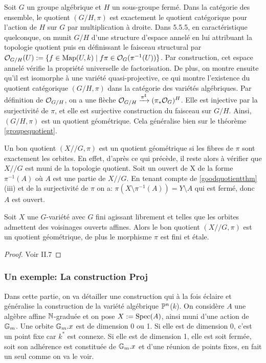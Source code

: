 \begin{ex}\label{groupQuotientGeometrique}
Soit $G$ un groupe algébrique et $H$ un sous-groupe fermé. Dans la catégorie des ensemble, le quotient $(G/H,\pi)$ est exactement le quotient catégorique pour l'action de $H$ sur $G$ par multiplication à droite. Dans \cite{LAGSpringer} 5.5.5, en caractéristique quelconque, on munit $G/H$ d'une structure d'espace annelé en lui attribuant la topologie quotient puis en définissant le faisceau structural par $\mathcal{O}_{G/H}(U):=\lbrace f\in\textrm{Map}(U,k)\mid f\pi \in \mathcal{O}_G(\pi^{-1}(U))\rbrace$. Par construction, cet espace annelé vérifie la propriété universelle de factorisation. De plus, on montre ensuite qu'il est isomorphe à une variété quasi-projective, ce qui montre l'existence du quotient catégorique $(G/H,\pi)$ dans la catégorie des variétés algébriques. Par définition de $\mathcal{O}_{G/H}$, on a une flèche $\mathcal{O}_{G/H} \xrightarrow{\pi^\sharp} (\pi_*\mathcal{O}_G)^H$. Elle est injective par la surjectivité de $\pi$, et elle est surjective construction du faisceau sur $G/H$. Ainsi, $(G/H,\pi)$ est un quotient géométrique. Cela généralise bien sur le théorème \ref{groupequotient}.
\end{ex}

\begin{ex}
Un bon quotient $(X//G, \pi)$ est un quotient géométrique si les fibres de $\pi$ sont exactement les orbites. En effet, d'après ce qui précède, il reste alors à vérifier que $X//G$ est muni de la topologie quotient. Soit un ouvert de X de la forme $\pi^{-1}(A)$ où $A$ est une partie de $X//G$. En tenant compte de \ref{goodquotientthm} (iii) et de la surjectivité de $\pi$ on a: $\pi(X\setminus \pi^{-1}(A))=Y\setminus A$ qui est fermé, donc $A$ est ouvert.
\end{ex}

\begin{prop}\label{GITEtaleFiniteGroup}
Soit $X$ une $G$-variété avec $G$ fini agissant librement et telles que les orbites admettent des voisinages ouverts affines. Alors le bon quotient $(X//G,\pi)$ est un quotient géométrique, de plus le morphisme $\pi$ est fini et étale.
\end{prop}
\begin{proof}
Voir \cite{MumfordAbelianVarieties} II.7
\end{proof}

\subsubsection{Un exemple: La construction Proj}
Dans cette partie, on va détailler une construction qui à la fois éclaire et généralise la construction de la variété algébrique $\mathbb{P}^n$($k$). On considère $A$ une algèbre affine $\mathbb{N}$-graduée et on pose $X:=\operatorname{Spec}(A)$, ainsi muni d'une action de $\mathbb{G}_m$. Une orbite $\mathbb{G}_m.x$ est de dimension 0 ou 1. Si elle est de dimension 0, c'est un point fixe car $k^*$ est connexe. Si elle est de dimension 1, elle est soit fermée, soit son adhérence est constituée de $\mathbb{G}_m.x$  et d'une réunion de points fixes, en fait un seul comme on va le voir.

